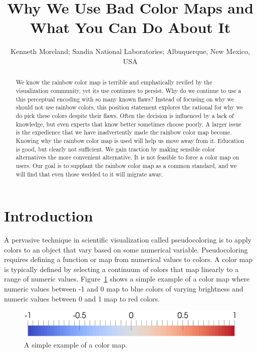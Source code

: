 \documentclass[letterpaper,twocolumn,fleqn]{article}
\title{Why We Use Bad Color Maps and What You Can Do About It}
\author{Kenneth Moreland; Sandia National Laboratories; Albuquerque, New
  Mexico, USA}
\date{} %
\begin{document}
 

\maketitle 

\thispagestyle{empty} %

\begin{abstract}
\noindent
We know the rainbow color map is terrible and emphatically reviled by the
visualization community, yet its use continues to persist. Why do we
continue to use a this perceptual encoding with so many known flaws?
Instead of focusing on why we should not use rainbow colors, this position
statement explores the rational for why we do pick these colors despite
their flaws. Often the decision is influenced by a lack of knowledge, but
even experts that know better sometimes choose poorly. A larger issue is
the expedience that we have inadvertently made the rainbow color map
become. Knowing why the rainbow color map is used will help us move away
from it. Education is good, but clearly not sufficient. We gain traction by
making sensible color alternatives the more convenient alternative. It is
not feasible to force a color map on users. Our goal is to supplant the
rainbow color map as a common standard, and we will find that even those
wedded to it will migrate away.
\end{abstract}


\section{Introduction}

\noindent
A pervasive technique in scientific visualization called pseudocoloring is
to apply colors to an object that vary based on some numerical variable.
Pseudocoloring requires defining a function or map from numerical values to
colors. A color map is typically defined by selecting a continuum of colors
that map linearly to a range of numeric values.
Figure~\ref{fig:ColorMapExample} shows a simple example of a color map
where numeric values between -1 and 0 map to blue colors of varying
brightness and numeric values between 0 and 1 map to red colors.

\begin{figure}[htb]
  \centering
  \includegraphics[width=.9\linewidth]{images/ColorMapExample}
  \caption{A simple example of a color map.}
  \label{fig:ColorMapExample}
\end{figure}
\end{document}
